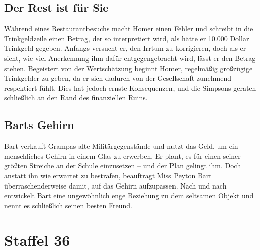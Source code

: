 \subsection{Der Rest ist für Sie}
Während eines Restaurantbesuchs macht Homer einen Fehler und schreibt in die Trinkgeldzeile einen Betrag, der so interpretiert wird, als hätte er 10.000 Dollar Trinkgeld gegeben. Anfangs versucht er, den Irrtum zu korrigieren, doch als er sieht, wie viel Anerkennung ihm dafür entgegengebracht wird, lässt er den Betrag stehen. Begeistert von der Wertschätzung beginnt Homer, regelmäßig großzügige Trinkgelder zu geben, da er sich dadurch von der Gesellschaft zunehmend respektiert fühlt. Dies hat jedoch ernste Konsequenzen, und die Simpsons geraten schließlich an den Rand des finanziellen Ruins.


\subsection{Barts Gehirn}\label{35ABF12}
Bart verkauft Grampas alte Militärgegenstände und nutzt das Geld, um ein menschliches Gehirn in einem Glas zu erwerben. Er plant, es für einen seiner größten Streiche an der Schule einzusetzen -- und der Plan gelingt ihm. Doch anstatt ihn wie erwartet zu bestrafen, beauftragt Miss Peyton Bart überraschenderweise damit, auf das Gehirn aufzupassen. Nach und nach entwickelt Bart eine ungewöhnlich enge Beziehung zu dem seltsamen Objekt und nennt es schließlich seinen besten Freund.


\section{Staffel 36}

